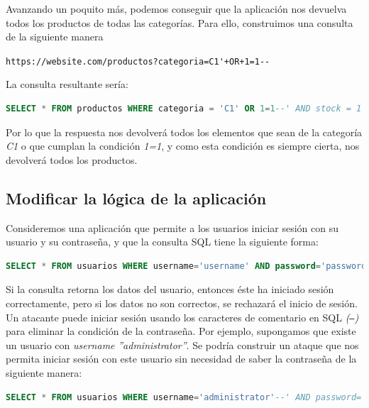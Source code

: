 \documentclass[bibliography=totocnumbered]{scrartcl}
\begin{document}
Avanzando un poquito más, podemos conseguir que la aplicación nos devuelva todos los productos de todas las categorías. Para ello, construimos una consulta de la siguiente manera
\begin{center}
\nolinkurl{https://website.com/productos?categoria=C1'+OR+1=1--}
\end{center}
La consulta resultante sería:
\begin{lstlisting}[language=SQL]
  SELECT * FROM productos WHERE categoria = 'C1' OR 1=1--' AND stock = 1
\end{lstlisting}
Por lo que la respuesta nos devolverá todos los elementos que sean de la categoría \textit{C1} o que cumplan la condición \textit{1=1}, y como esta condición es siempre cierta, nos devolverá todos los productos.

\subsection{Modificar la lógica de la aplicación}
Consideremos una aplicación que permite a los usuarios iniciar sesión con su usuario y su contraseña, y que la consulta SQL tiene la siguiente forma:
\begin{lstlisting}[language=SQL]
 SELECT * FROM usuarios WHERE username='username' AND password='password'
\end{lstlisting}
Si la consulta retorna los datos del usuario, entonces éste ha iniciado sesión correctamente, pero si los datos no son correctos, se rechazará el inicio de sesión.\\

Un atacante puede iniciar sesión usando los caracteres de comentario en SQL \textit{(\texttt{--})} para eliminar la condición de la contraseña. Por ejemplo, supongamos que existe un usuario con \textit{username} \textit{''administrator''}. Se podría construir un ataque que nos permita iniciar sesión con este usuario sin necesidad de saber la contraseña de la siguiente manera:
\begin{lstlisting}[language=SQL]
 SELECT * FROM usuarios WHERE username='administrator'--' AND password=''
\end{lstlisting}
\end{document}
